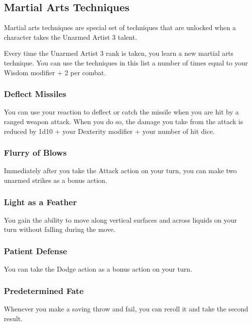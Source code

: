 \subsection*{Martial Arts Techniques} \label{tec::martialartstechniques}
Martial arts techniques are special set of techniques that are unlocked when a character takes the Unarmed Artist 3 talent.

Every time the Unarmed Artist 3 rank is taken, you learn a new martial arts technique.
You can use the techniques in this list a number of times equal to your Wisdom modifier + 2 per combat.

\subsubsection{Deflect Missiles} \label{mtec::deflectmissiles}
You can use your reaction to deflect or catch the missile when you are hit by a ranged weapon attack.
When you do so, the damage you take from the attack is reduced by 1d10 + your Dexterity modifier + your number of hit dice.

\subsubsection{Flurry of Blows} \label{mtec::flurryofblows}
Immediately after you take the Attack action on your turn, you can make two unarmed strikes as a bonus action.

\subsubsection{Light as a Feather} \label{mtec::lightasafeather}
You gain the ability to move along vertical surfaces and across liquids on your turn without falling during the move.

\subsubsection{Patient Defense} \label{mtec::patientdefense}
You can take the Dodge action as a bonus action on your turn.

\subsubsection{Predetermined Fate} \label{mtec::predeterminedfate}
Whenever you make a saving throw and fail, you can reroll it and take the second result.

